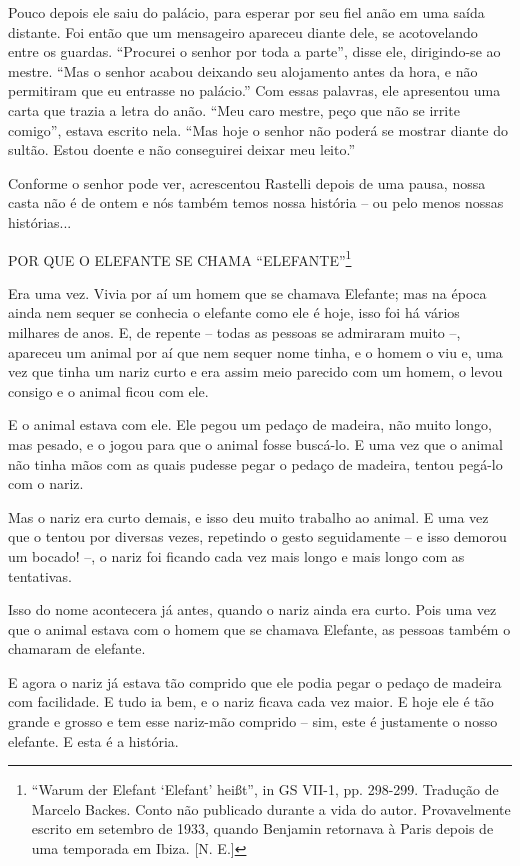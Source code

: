 Pouco depois ele saiu do palácio, para esperar por seu fiel anão em uma
saída distante. Foi então que um mensageiro apareceu diante dele, se
acotovelando entre os guardas. ``Procurei o senhor por toda a parte'',
disse ele, dirigindo-se ao mestre. ``Mas o senhor acabou deixando seu
alojamento antes da hora, e não permitiram que eu entrasse no palácio.''
Com essas palavras, ele apresentou uma carta que trazia a letra do anão.
``Meu caro mestre, peço que não se irrite comigo'', estava escrito nela.
``Mas hoje o senhor não poderá se mostrar diante do sultão. Estou doente
e não conseguirei deixar meu leito.''

Conforme o senhor pode ver, acrescentou Rastelli depois de uma pausa,
nossa casta não é de ontem e nós também temos nossa história -- ou pelo
menos nossas histórias...

POR QUE O ELEFANTE SE CHAMA ``ELEFANTE''\footnote{``Warum der Elefant
  `Elefant' heißt'', in GS VII-1, pp. 298-299. Tradução de Marcelo
  Backes. Conto não publicado durante a vida do autor. Provavelmente
  escrito em setembro de 1933, quando Benjamin retornava à Paris depois
  de uma temporada em Ibiza. {[}N. E.{]}}

Era uma vez. Vivia por aí um homem que se chamava Elefante; mas na época
ainda nem sequer se conhecia o elefante como ele é hoje, isso foi há
vários milhares de anos. E, de repente -- todas as pessoas se admiraram
muito --, apareceu um animal por aí que nem sequer nome tinha, e o homem
o viu e, uma vez que tinha um nariz curto e era assim meio parecido com
um homem, o levou consigo e o animal ficou com ele.

E o animal estava com ele. Ele pegou um pedaço de madeira, não muito
longo, mas pesado, e o jogou para que o animal fosse buscá-lo. E uma vez
que o animal não tinha mãos com as quais pudesse pegar o pedaço de
madeira, tentou pegá-lo com o nariz.

Mas o nariz era curto demais, e isso deu muito trabalho ao animal. E uma
vez que o tentou por diversas vezes, repetindo o gesto seguidamente -- e
isso demorou um bocado! --, o nariz foi ficando cada vez mais longo e
mais longo com as tentativas.

Isso do nome acontecera já antes, quando o nariz ainda era curto. Pois
uma vez que o animal estava com o homem que se chamava Elefante, as
pessoas também o chamaram de elefante.

E agora o nariz já estava tão comprido que ele podia pegar o pedaço de
madeira com facilidade. E tudo ia bem, e o nariz ficava cada vez maior.
E hoje ele é tão grande e grosso e tem esse nariz-mão comprido -- sim,
este é justamente o nosso elefante. E esta é a história.


